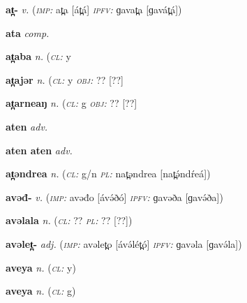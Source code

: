 \newentry
\headword\textbf{at̪-}
\ipa{[át̪-]}
\synpos\textit{v.} 
\imperative(\textit {\textsc{imp:}} at̪a [át̪á] 
\imperfective\textit{\textsc{ipfv:}} ɡavat̪a [ɡavát̪á])

\newentry
\headword\textbf{ata} 
\ipa{[ata]} 
\synpos\textit{comp.} 

\newentry
\headword\textbf{at̪aba}
\ipa{[at̪ába]}
\synpos\textit{n.} 
\class(\textit{\textsc{cl:}} {y}

\newentry
\headword\textbf{at̪ajər}
\ipa{[at̪áʤər]}
\synpos\textit{n.} 
\class(\textit{\textsc{cl:}} {y}
\object\textit{\textsc{obj:}} ?? [??] %

\newentry
\headword\textbf{at̪arneaŋ}
\ipa{[át̪árnéaŋ]}
\synpos\textit{n.} 
\class(\textit{\textsc{cl:}} {g}
\object\textit{\textsc{obj:}} ?? [??] %

\newentry
\headword\textbf{aten} 
\ipa{[aten]} 
\synpos\textit{adv.} 

\newentry
\headword\textbf{aten aten} 
\synpos\textit{adv.} 

\newentry
\headword\textbf{at̪əndrea}
\ipa{[at̪ə́ndŕeá]}
\synpos\textit{n.} 
\class(\textit{\textsc{cl:}} {g/n}
\plural\textit{\textsc{pl:}} nat̪əndrea [nat̪ə́ndŕeá])

\newentry
\headword\textbf{avəđ-}
\ipa{[ávə́ð-]}
\synpos\textit{v.} 
\imperative(\textit {\textsc{imp:}} avəđo [ávə́ðó] 
\imperfective\textit{\textsc{ipfv:}} ɡavəða [ɡavə́ða])

\newentry
\headword\textbf{avəlala}
\ipa{[avəlala]}
\synpos\textit{n.} 
\class(\textit{\textsc{cl:}} {??} %
\plural\textit{\textsc{pl:}} ?? [??]) %

\newentry
\headword\textbf{avəlet̪-}
\ipa{[ávə́lét̪-]}
\synpos\textit{adj.} 
\imperative(\textit {\textsc{imp:}} avəlet̪o [ávə́lét̪ó] 
\imperfective\textit{\textsc{ipfv:}} ɡavəla [ɡavə́la])

\newentry
\headword\textbf{aveya}
\ipa{[aveja]}
\synpos\textit{n.} 
\class(\textit{\textsc{cl:}} {y})

\newentry
\headword\textbf{aveya}
\ipa{[áveja]}
\synpos\textit{n.} 
\class(\textit{\textsc{cl:}} {g})

